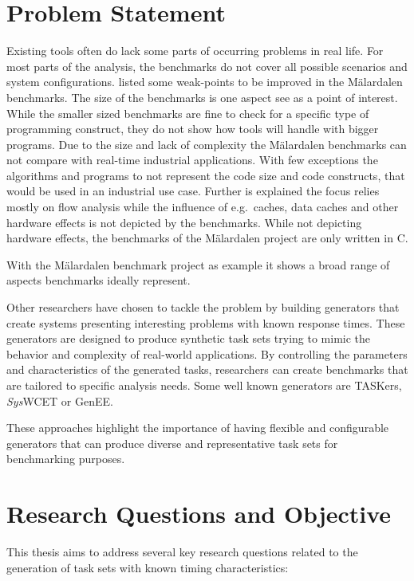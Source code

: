 \section{Problem Statement}\label{sec:problem_statement}
Existing tools often do lack some parts of occurring problems in real life.
For most parts of the analysis, the benchmarks do not cover all possible scenarios and system configurations.
\textcite{gustafssonMalardalenWCETBenchmarks2012} listed some weak-points to be improved in the Mälardalen benchmarks.
The size of the benchmarks is one aspect \citeauthor{gustafssonMalardalenWCETBenchmarks2012} see as a point of interest.
While the smaller sized benchmarks are fine to check for a specific type of programming construct, they do not show how tools will handle with bigger programs.
Due to the size and lack of complexity the Mälardalen benchmarks can not compare with real-time industrial applications.
With few exceptions the algorithms and programs to not represent the code size and code constructs, that would be used in an industrial use case.
Further is explained the focus relies mostly on flow analysis while the influence of e.g.~caches, data caches and other hardware effects is not depicted by the benchmarks.
While not depicting hardware effects, the benchmarks of the Mälardalen project are only written in C.

With the Mälardalen benchmark project as example it shows a broad range of aspects benchmarks ideally represent.

Other researchers have chosen to tackle the problem by building generators that create systems presenting interesting problems with known response times. 
These generators are designed to produce synthetic task sets trying to mimic the behavior and complexity of real-world applications. 
By controlling the parameters and characteristics of the generated tasks, researchers can create benchmarks that are tailored to specific analysis needs.
Some well known generators are TASKers\cite{eichlerTASKersWholeSystemGenerator2018}, \textit{Sys}WCET\cite{dietrichSysWCETWholeSystemResponseTime} or GenEE\cite{eichlerGENEEBenchmarkGenerator2019}.

These approaches highlight the importance of having flexible and configurable generators that can produce diverse and representative task sets for benchmarking purposes.

\section{Research Questions and Objective}\label{sec:research_questions_objectives}
This thesis aims to address several key research questions related to the generation of task sets with known timing characteristics:

